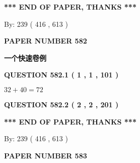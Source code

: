 \documentclass{ctexart}
\begin{document}
   
   
\vspace{1.0in} 
{\textbf{\large{ *** END OF PAPER, THANKS *** }}} 
   
   
\hspace{1.0in} By: 
 239 ( 416 ,  613 )
   
   
   
   
\newpage 
\setcounter{page}{ 
   582001 } 
   
   
   
   
 {\textbf{ \Large{ PAPER NUMBER  582  }}}
   
   
\vspace{0.2in}
   
   
   
   
   
   
 \vspace{0.2in}
{\LARGE {\textbf{ 一个快速卷例}}}
   
   
  
\vspace{0.2in}
  
{\textbf{\Large{QUESTION
582.1 
 ( 1 , 1 , 101 )
}}}
  
  
 
 

$ %
32 +  %
40=   %
72$
 
 
  
\vspace{0.2in}
  
{\textbf{\Large{QUESTION
582.2 
 ( 2 , 2 , 201 )
}}}
  
  
   
   
 \vspace{0.2in}
 
   
   
   
   
\vspace{1.0in} 
{\textbf{\large{ *** END OF PAPER, THANKS *** }}} 
   
   
\hspace{1.0in} By: 
 239 ( 416 ,  613 )
   
   
   
   
\newpage 
\setcounter{page}{ 
   583001 } 
   
   
   
   
 {\textbf{ \Large{ PAPER NUMBER  583  }}}
   
   
\vspace{0.2in}
   
\end{document}
